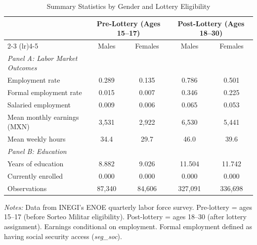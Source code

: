 \begin{table}[t]
\centering
\caption{Summary Statistics by Gender and Lottery Eligibility}
\label{tab:summary}
\small
\begin{tabular}{lcccc}
\toprule
 & \multicolumn{2}{c}{Pre-Lottery (Ages 15--17)} & \multicolumn{2}{c}{Post-Lottery (Ages 18--30)} \\
\cmidrule(lr){2-3} \cmidrule(lr){4-5}
 & Males & Females & Males & Females \\
\midrule
\textit{Panel A: Labor Market Outcomes} \\[3pt]
Employment rate & 0.289 & 0.135 & 0.786 & 0.501 \\
Formal employment rate & 0.015 & 0.007 & 0.346 & 0.225 \\
Salaried employment & 0.009 & 0.006 & 0.065 & 0.053 \\
Mean monthly earnings (MXN) & 3,531 & 2,922 & 6,530 & 5,441 \\
Mean weekly hours & 34.4 & 29.7 & 46.0 & 39.6 \\
\midrule
\textit{Panel B: Education} \\[3pt]
Years of education & 8.882 & 9.026 & 11.504 & 11.742 \\
Currently enrolled & 0.000 & 0.000 & 0.000 & 0.000 \\
\midrule
Observations & 87,340 & 84,606 & 327,091 & 336,698 \\
\bottomrule
\end{tabular}
\begin{tablenotes}
\footnotesize
\item \textit{Notes:} Data from INEGI's ENOE quarterly labor force survey. Pre-lottery = ages 15--17 (before Sorteo Militar eligibility). Post-lottery = ages 18--30 (after lottery assignment). Earnings conditional on employment. Formal employment defined as having social security access (\textit{seg\_soc}).
\end{tablenotes}
\end{table}

